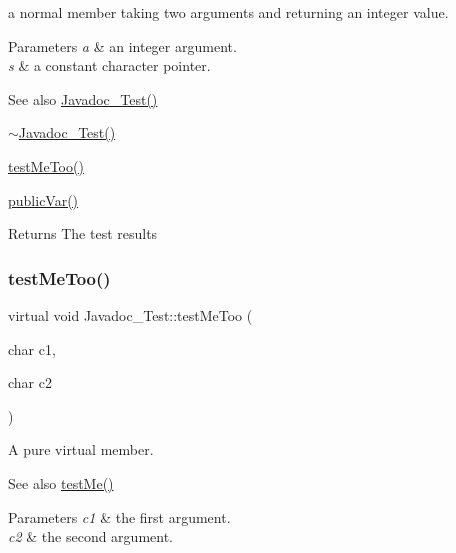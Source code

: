 a normal member taking two arguments and returning an integer value. 
\begin{DoxyParams}{Parameters}
{\em a} & an integer argument. \\
\hline
{\em s} & a constant character pointer. \\
\hline
\end{DoxyParams}
\begin{DoxySeeAlso}{See also}
\hyperlink{class_javadoc___test_a17313327932ae97596b0a455ba8342cc}{Javadoc\+\_\+\+Test()} 

\hyperlink{class_javadoc___test_a60016cd15a4ed82bbc35be79a0a6a6b5}{$\sim$\+Javadoc\+\_\+\+Test()} 

\hyperlink{class_javadoc___test_ac2b39cabbe80957ae3e8bc2bd4e887f6}{test\+Me\+Too()} 

\hyperlink{class_javadoc___test_a44a516fbc3a4865e2dcae34649c9df6a}{public\+Var()} 
\end{DoxySeeAlso}
\begin{DoxyReturn}{Returns}
The test results 
\end{DoxyReturn}
\mbox{\label{class_javadoc___test_ac2b39cabbe80957ae3e8bc2bd4e887f6}} 
\subsubsection{\texorpdfstring{test\+Me\+Too()}{testMeToo()}}
{\footnotesize\ttfamily virtual void Javadoc\+\_\+\+Test\+::test\+Me\+Too (\begin{DoxyParamCaption}\item[{char}]{c1,  }\item[{char}]{c2 }\end{DoxyParamCaption})\hspace{0.3cm}{\ttfamily [pure virtual]}}

A pure virtual member. \begin{DoxySeeAlso}{See also}
\hyperlink{class_javadoc___test_a0c472683ed25ff096e8a9edfb18d550c}{test\+Me()} 
\end{DoxySeeAlso}

\begin{DoxyParams}{Parameters}
{\em c1} & the first argument. \\
\hline
{\em c2} & the second argument. \\
\hline
\end{DoxyParams}


